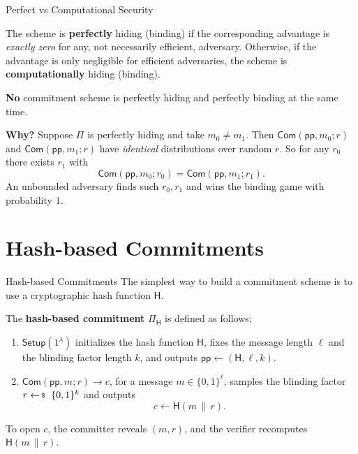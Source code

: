 \documentclass{zkdl-presentation-template}
\begin{document}
    \begin{frame}{Perfect vs Computational Security}
        \small
        \begin{definition}
            The scheme is \textbf{perfectly} hiding (binding) if the corresponding advantage is \emph{exactly zero} for any, not necessarily efficient, adversary.
            Otherwise, if the advantage is only negligible for efficient adversaries, the scheme is \textbf{computationally} hiding (binding).
        \end{definition}
        \pause

        \begin{remark}
            \textbf{No} commitment scheme is perfectly hiding and perfectly binding at the same time.
        \end{remark}
        \pause

        \textbf{Why?} Suppose $\Pi$ is perfectly hiding and take $m_0 \neq m_1$. Then $\mathsf{Com}(\mathsf{pp}, m_0; r)$ and $\mathsf{Com}(\mathsf{pp}, m_1; r)$ have \emph{identical} distributions over random $r$.\pause{} So for any $r_0$ there exists $r_1$ with
        \begin{equation*}
            \mathsf{Com}(\mathsf{pp}, m_0; r_0) = \mathsf{Com}(\mathsf{pp}, m_1; r_1).
        \end{equation*}
        An unbounded adversary finds such $r_0, r_1$ and wins the binding game with probability $1$.
    \end{frame}

    \section{Hash-based Commitments}

    \begin{frame}{Hash-based Commitments}
        The simplest way to build a commitment scheme is to use a cryptographic hash function $\mathsf{H}$.

        \begin{definition}
            The \textbf{hash-based commitment} $\Pi_{\mathsf{H}}$ is defined as follows:
            \begin{enumerate}
                \item $\mathsf{Setup}(1^{\lambda})$ initializes the hash function $\mathsf{H}$, fixes the message length $\ell$ and the blinding factor length $k$, and outputs $\mathsf{pp} \gets (\mathsf{H}, \ell, k)$.\pause
                \item $\mathsf{Com}(\mathsf{pp}, m; r) \to c$, for a message $m \in \{0,1\}^{\ell}$, samples the blinding factor $r \leftarrowS \{0,1\}^{k}$ and outputs
                \begin{equation*}
                    c \gets \mathsf{H}(m \,\|\, r).
                \end{equation*}
            \end{enumerate}
        \end{definition}
        \pause

        To open $c$, the committer reveals $(m, r)$, and the verifier recomputes $\mathsf{H}(m \,\|\, r)$.
    \end{frame}
\end{document}
